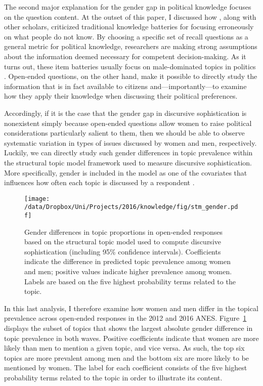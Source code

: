 The second major explanation for the gender gap in political knowledge focuses on the question content. At the outset of this paper, I discussed how \citet{cramer2017fact}, along with other scholars, criticized traditional knowledge batteries for focusing erroneously on what people do not know. By choosing a specific set of recall questions as a general metric for political knowledge, researchers are making strong assumptions about the information deemed necessary for competent decision-making. As it turns out, these item batteries usually focus on male-dominated topics in politics \citep{dolan2011women}. Open-ended questions, on the other hand, make it possible to directly study the information that is in fact available to citizens and---importantly---to examine how they apply their knowledge when discussing their political preferences.

Accordingly, if it is the case that the gender gap in discursive sophistication is nonexistent simply because open-ended questions allow women to raise political considerations particularly salient to them, then we should be able to observe systematic variation in types of issues discussed by women and men, respectively. Luckily, we can directly study such gender differences in topic prevalence within the structural topic model framework used to measure discursive sophistication. More specifically, gender is included in the model as one of the covariates that influences how often each topic is discussed by a respondent \citep[see also][for details]{roberts2014structural}.

\begin{figure}[h]\centering
\texttt{[image: /data/Dropbox/Uni/Projects/2016/knowledge/fig/stm\_gender.pdf]}
\caption[Gender differences in topic proprtions in open-ended responses]{Gender differences in topic proportions in open-ended responses based on the structural topic model used to compute discursive sophistication (including 95\% confidence intervals). Coefficients indicate the difference in predicted topic prevalence among women and men; positive values indicate higher prevalence among women. Labels are based on the five highest probability terms related to the topic.
}\label{fig:stm_gender}
\end{figure}

In this last analysis, I therefore examine how women and men differ in the topical prevalence across open-ended responses in the 2012 and 2016 ANES. Figure~\ref{fig:stm_gender} displays the subset of topics that shows the largest absolute gender difference in topic prevalence in both waves. Positive coefficients indicate that women are more likely than men to mention a given topic, and vice versa. As such, the top six topics are more prevalent among men and the bottom six are more likely to be mentioned by women. The label for each coefficient consists of the five highest probability terms related to the topic in order to illustrate its content.

